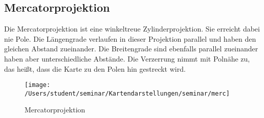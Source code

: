 \subsection{Mercatorprojektion}
\label{sec:mercator} 
Die Mercatorprojektion ist eine winkeltreue Zylinderprojektion. Sie erreicht dabei nie Pole.
Die Längengrade verlaufen in dieser Projektion parallel und haben den gleichen Abstand zueinander.
Die Breitengrade sind ebenfalls parallel zueinander haben aber unterschiedliche Abstände.
Die Verzerrung nimmt mit Polnähe zu, das heißt, dass die Karte zu den Polen hin gestreckt wird.\\

\begin{figure}[hbtp]
\centering
\texttt{[image: /Users/student/seminar/Kartendarstellungen/seminar/merc]} \caption{Mercatorprojektion}
\end{figure}
\newpage 